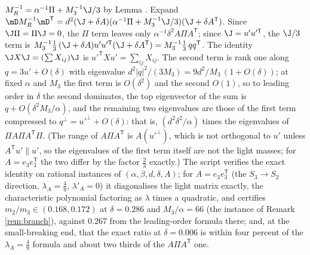 $M_{R}^{-1} = \alpha^{-1}\Pi + M_{3}^{-1}\J/3$ by Lemma . Expand $\mD M_{R}^{-1}\mD^{\mathsf{T}} = d^{2}(\J + \delta A)(\alpha^{-1}\Pi + M_{3}^{-1}\J/3)(\J + \delta A^{\mathsf{T}})$. Since $\J\Pi = \Pi\J = 0$, the $\Pi$ term leaves only $\alpha^{-1}\delta^{2}A\Pi A^{\mathsf{T}}$; since $\J = u'u'^{\mathsf{T}}$, the $\J/3$ term is $M_{3}^{-1}\tfrac13\,(\J + \delta A)u'u'^{\mathsf{T}}(\J + \delta A^{\mathsf{T}}) = M_{3}^{-1}\tfrac13\,qq^{\mathsf{T}}$. The identity $\J X\J = (\sum X_{ij})\J$ is $u'^{\mathsf{T}}Xu' = \sum_{ij}X_{ij}$. The second term is rank one along $q = 3u' + O(\delta)$ with eigenvalue $d^{2}|q|^{2}/(3M_{3}) = 9d^{2}/M_{3}\,(1 + O(\delta))$; at fixed $\alpha$ and $M_{3}$ the first term is $O(\delta^{2})$ and the second $O(1)$, so to leading order in $\delta$ the second dominates, the top eigenvector of the sum is $q + O(\delta^{2}M_{3}/\alpha)$, and the remaining two eigenvalues are those of the first term compressed to $q^{\perp} = u'^{\perp} + O(\delta)$: that is, $(d^{2}\delta^{2}/\alpha)$ times the eigenvalues of $\Pi A\Pi A^{\mathsf{T}}\Pi$. (The range of $A\Pi A^{\mathsf{T}}$ is $A(u'^{\perp})$, which is not orthogonal to $u'$ unless $A^{\mathsf{T}}u' \parallel u'$, so the eigenvalues of the first term itself are not the light masses; for $A = e_{3}e_{3}^{\mathsf{T}}$ the two differ by the factor $\tfrac23$ exactly.) The script verifies the exact identity on rational instances of $(\alpha, \beta, d, \delta, A)$; for $A = e_{3}e_{3}^{\mathsf{T}}$ (the $S_{3} \to S_{2}$ direction, $\lambda_{A} = \tfrac49$, $\lambda'_{A} = 0$) it diagonalises the light matrix exactly, the characteristic polynomial factoring as $\lambda$ times a quadratic, and certifies $m_{2}/m_{3} \in (0.168, 0.172)$ at $\delta = 0.286$ and $M_{3}/\alpha = 66$ (the instance of Remark \ref{rem:branch}), against $0.267$ from the leading-order formula there; and, at the small-breaking end, that the exact ratio at $\delta = 0.006$ is within four percent of the $\lambda_{A} = \tfrac49$ formula and about two thirds of the $A\Pi A^{\mathsf{T}}$ one.
